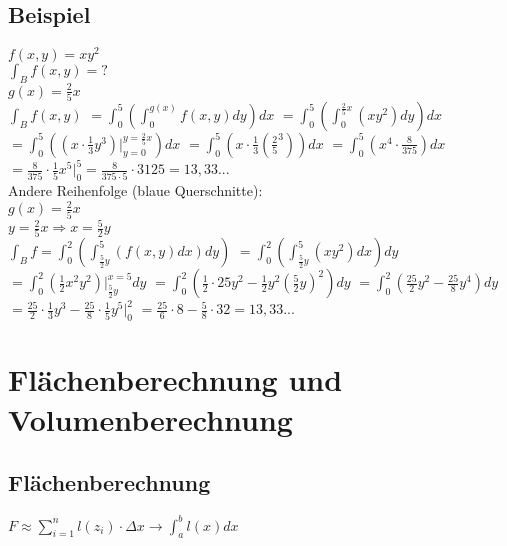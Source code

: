 \renewcommand{\ldate}{2015-10-09}

\subsection{Beispiel}
$ f(x,y)= xy^2$\\
$ \int_B f(x,y) = ? $\\
$ g(x) = \frac{2}{5} x $\\

$ \int_B f(x,y) $
$ = \int_0^5 ( \int_0^{g(x)} f(x,y) dy ) dx $
$ = \int_0^5 ( \int_0^{\frac{2}{5}x} (xy^2) dy ) dx $
$ = \int_0^5 ( (x\cdot \frac{1}{3} y^3) |_{y=0}^{y=\frac{2}{5}x} ) dx $
$ = \int_0^5 (x \cdot \frac{1}{3} (\frac{2}{5}^3)) dx $
$ = \int_0^5 (x^4\cdot \frac{8}{375}) dx $
$ = \frac{8}{375} \cdot \frac{1}{5} x^5 |_0^5 = \frac{8}{375 \cdot 5} \cdot 3125 = 13,33 ... $\\
Andere Reihenfolge (blaue Querschnitte):\\
$ g(x) = \frac{2}{5} x$\\
$ y= \frac{2}{5} x \Rightarrow x=\frac{5}{2} y $\\
$ \int_B f = \int_0^2 ( \int_{\frac{5}{2} y}^5 (f(x,y)dx)dy) $
$ = \int_0^2 ( \int_{\frac{5}{2} y}^5 (xy^2)dx)dy $
$ = \int_0^2 ( \frac{1}{2} x^2 y^2) |_{\frac{5}{2}y}^{x=5} dy $
$ = \int_0^2 (\frac{1}{2}\cdot 25 y^2 - \frac{1}{2} y^2 (\frac{5}{2}y)^2) dy $
$ = \int_0^2 (\frac{25}{2} y^2 - \frac{25}{8} y^4)dy $
$ = \frac{25}{2}\cdot \frac{1}{3} y^3 - \frac{25}{8}\cdot \frac{1}{5}y^5 |_0^2 $
$ = \frac{25}{6}\cdot 8 - \frac{5}{8}\cdot 32 = 13,33...$

\section{Flächenberechnung und Volumenberechnung}

\subsection{Flächenberechnung}

$ F \approx \sum_{i=1}^{n} l(z_i)\cdot \Delta x \rightarrow \int_a^b l(x) dx $ 

